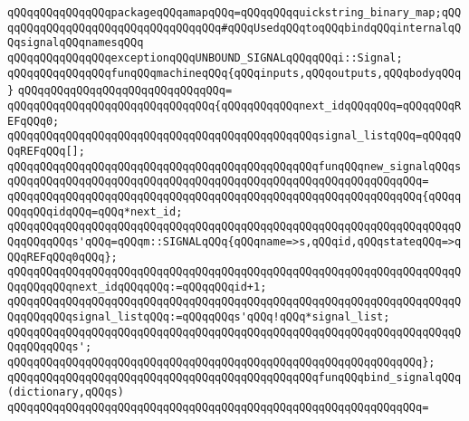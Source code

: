 \verb|qQQqqQQqqQQqqQQqpackageqQQqamapqQQq=qQQqqQQqquickstring_binary_map;qQQqqQQqqQQqqQQqqQQqqQQqqQQqqQQqqQQq#qQQqUsedqQQqtoqQQqbindqQQqinternalqQQqsignalqQQqnamesqQQq|\newline
\newline
\verb|qQQqqQQqqQQqqQQqexceptionqQQqUNBOUND_SIGNALqQQqqQQqi::Signal;|\newline
\newline
\verb|qQQqqQQqqQQqqQQqfunqQQqmachineqQQq{qQQqinputs,qQQqoutputs,qQQqbodyqQQq}|\newline
\verb|qQQqqQQqqQQqqQQqqQQqqQQqqQQqqQQq=|\newline
\verb|qQQqqQQqqQQqqQQqqQQqqQQqqQQqqQQq{qQQqqQQqqQQqnext_idqQQqqQQq=qQQqqQQqREFqQQq0;|\newline
\verb|qQQqqQQqqQQqqQQqqQQqqQQqqQQqqQQqqQQqqQQqqQQqqQQqsignal_listqQQq=qQQqqQQqREFqQQq[];|\newline
\newline
\verb|qQQqqQQqqQQqqQQqqQQqqQQqqQQqqQQqqQQqqQQqqQQqqQQqfunqQQqnew_signalqQQqs|\newline
\verb|qQQqqQQqqQQqqQQqqQQqqQQqqQQqqQQqqQQqqQQqqQQqqQQqqQQqqQQqqQQqqQQq=|\newline
\verb|qQQqqQQqqQQqqQQqqQQqqQQqqQQqqQQqqQQqqQQqqQQqqQQqqQQqqQQqqQQqqQQq{qQQqqQQqqQQqidqQQq=qQQq*next_id;|\newline
\newline
\verb|qQQqqQQqqQQqqQQqqQQqqQQqqQQqqQQqqQQqqQQqqQQqqQQqqQQqqQQqqQQqqQQqqQQqqQQqqQQqqQQqs'qQQq=qQQqm::SIGNALqQQq{qQQqname=>s,qQQqid,qQQqstateqQQq=>qQQqREFqQQq0qQQq};|\newline
\newline
\verb|qQQqqQQqqQQqqQQqqQQqqQQqqQQqqQQqqQQqqQQqqQQqqQQqqQQqqQQqqQQqqQQqqQQqqQQqqQQqqQQqnext_idqQQqqQQq:=qQQqqQQqid+1;|\newline
\verb|qQQqqQQqqQQqqQQqqQQqqQQqqQQqqQQqqQQqqQQqqQQqqQQqqQQqqQQqqQQqqQQqqQQqqQQqqQQqqQQqsignal_listqQQq:=qQQqqQQqs'qQQq!qQQq*signal_list;|\newline
\newline
\verb|qQQqqQQqqQQqqQQqqQQqqQQqqQQqqQQqqQQqqQQqqQQqqQQqqQQqqQQqqQQqqQQqqQQqqQQqqQQqqQQqs';|\newline
\verb|qQQqqQQqqQQqqQQqqQQqqQQqqQQqqQQqqQQqqQQqqQQqqQQqqQQqqQQqqQQqqQQq};|\newline
\newline
\verb|qQQqqQQqqQQqqQQqqQQqqQQqqQQqqQQqqQQqqQQqqQQqqQQqfunqQQqbind_signalqQQq(dictionary,qQQqs)|\newline
\verb|qQQqqQQqqQQqqQQqqQQqqQQqqQQqqQQqqQQqqQQqqQQqqQQqqQQqqQQqqQQqqQQq=|\newline
